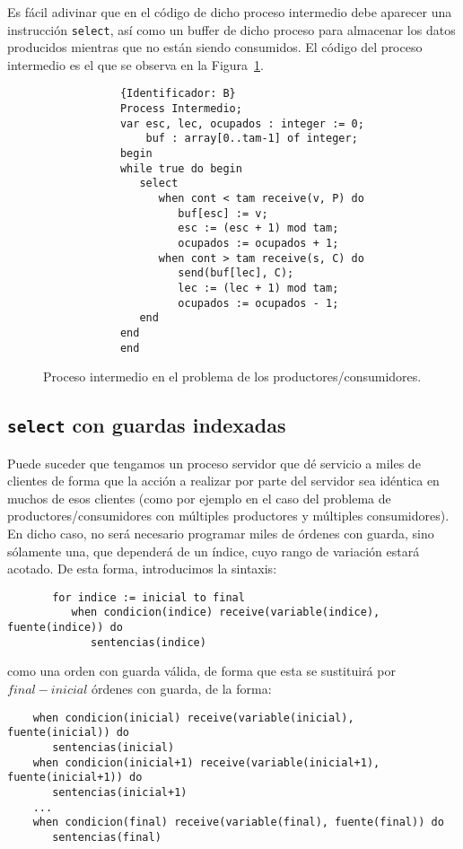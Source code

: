 \begin{ejemplo}
    Es fácil adivinar que en el código de dicho proceso intermedio debe aparecer una instrucción \verb|select|, así como un buffer de dicho proceso para almacenar los datos producidos mientras que no están siendo consumidos. El código del proceso intermedio es el que se observa en la Figura~\ref{fig:prod_cons_intermedio}.
    \begin{figure}[H]
        \centering
        \begin{verbatim}
            {Identificador: B}
            Process Intermedio;
            var esc, lec, ocupados : integer := 0;
                buf : array[0..tam-1] of integer;
            begin
            while true do begin
               select
                  when cont < tam receive(v, P) do
                     buf[esc] := v;
                     esc := (esc + 1) mod tam;
                     ocupados := ocupados + 1;
                  when cont > tam receive(s, C) do
                     send(buf[lec], C);
                     lec := (lec + 1) mod tam;
                     ocupados := ocupados - 1;
               end
            end
            end
        \end{verbatim}
        \caption{Proceso intermedio en el problema de los productores/consumidores.}
        \label{fig:prod_cons_intermedio}
    \end{figure}
\end{ejemplo}

\subsection{\texttt{select} con guardas indexadas}
Puede suceder que tengamos un proceso servidor que dé servicio a miles de clientes de forma que la acción a realizar por parte del servidor sea idéntica en muchos de esos clientes (como por ejemplo en el caso del problema de productores/consumidores con múltiples productores y múltiples consumidores).\\

En dicho caso, no será necesario programar miles de órdenes con guarda, sino sólamente una, que dependerá de un índice, cuyo rango de variación estará acotado. De esta forma, introducimos la sintaxis:
\begin{verbatim}
       for indice := inicial to final
          when condicion(indice) receive(variable(indice), fuente(indice)) do
             sentencias(indice)
\end{verbatim}
como una orden con guarda válida, de forma que esta se sustituirá por $final-inicial$ órdenes con guarda, de la forma:
\begin{verbatim}
    when condicion(inicial) receive(variable(inicial), fuente(inicial)) do
       sentencias(inicial)
    when condicion(inicial+1) receive(variable(inicial+1), fuente(inicial+1)) do
       sentencias(inicial+1)
    ...
    when condicion(final) receive(variable(final), fuente(final)) do
       sentencias(final)
\end{verbatim}

